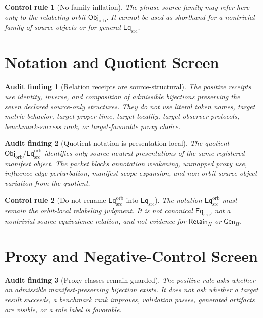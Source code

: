 \documentclass[11pt]{article}
\newcommand{\ObjOrb}{\mathsf{Obj}_{\mathrm{orb}}}
\newcommand{\EqSrc}{\mathsf{Eq}_{\mathrm{src}}}
\newcommand{\EqOrb}{\mathsf{Eq}_{\mathrm{src}}^{\mathrm{orb}}}
\newcommand{\GenH}{\mathsf{Gen}_{H}}
\newcommand{\RetainH}{\mathsf{Retain}_{H}}
\newtheorem{auditfinding}{Audit finding}
\newtheorem{controlrule}{Control rule}
\begin{document}
\begin{controlrule}[No family inflation]
The phrase source-family may refer here only to the relabeling orbit
\(\ObjOrb\). It cannot be used as shorthand for a nontrivial family of
source objects or for general \(\EqSrc\).
\end{controlrule}

\section{Notation and Quotient Screen}

\begin{auditfinding}[Relation receipts are source-structural]
The positive receipts use identity, inverse, and composition of
admissible bijections preserving the seven declared source-only
structures. They do not use literal token names, target metric behavior,
target proper time, target locality, target observer protocols,
benchmark-success rank, or target-favorable proxy choice.
\end{auditfinding}

\begin{auditfinding}[Quotient notation is presentation-local]
The quotient \(\ObjOrb/{\EqOrb}\) identifies only source-neutral
presentations of the same registered manifest object. The packet blocks
annotation weakening, unmapped proxy use, influence-edge perturbation,
manifest-scope expansion, and non-orbit source-object variation from the
quotient.
\end{auditfinding}

\begin{controlrule}[Do not rename \(\EqOrb\) into \(\EqSrc\)]
The notation \(\EqOrb\) must remain the orbit-local relabeling judgment.
It is not canonical \(\EqSrc\), not a nontrivial source-equivalence
relation, and not evidence for \(\RetainH\) or \(\GenH\).
\end{controlrule}

\section{Proxy and Negative-Control Screen}

\begin{auditfinding}[Proxy classes remain guarded]
The positive rule asks whether an admissible manifest-preserving
bijection exists. It does not ask whether a target result succeeds, a
benchmark rank improves, validation passes, generated artifacts are
visible, or a role label is favorable.
\end{auditfinding}
\end{document}
